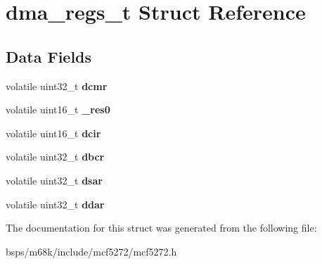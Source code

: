 \hypertarget{structdma__regs__t}{}\section{dma\+\_\+regs\+\_\+t Struct Reference}
\label{structdma__regs__t}
\subsection*{Data Fields}
\begin{DoxyCompactItemize}
\item 
\mbox{\label{structdma__regs__t_ac13b341ab8a7f3d5c92d0bb305bce47d}} 
volatile uint32\+\_\+t {\bfseries dcmr}
\item 
\mbox{\label{structdma__regs__t_af01259b03b50878fa6541ab8a9e7ebee}} 
volatile uint16\+\_\+t {\bfseries \+\_\+res0}
\item 
\mbox{\label{structdma__regs__t_a59b4cdfb2714e097e8d5e601e752529e}} 
volatile uint16\+\_\+t {\bfseries dcir}
\item 
\mbox{\label{structdma__regs__t_a1f27824ecded695c7a1b600ae29e17e0}} 
volatile uint32\+\_\+t {\bfseries dbcr}
\item 
\mbox{\label{structdma__regs__t_a372faeed963942fb8174a1efc563e637}} 
volatile uint32\+\_\+t {\bfseries dsar}
\item 
\mbox{\label{structdma__regs__t_ae5a9978e47eb9e568893b33b296c8da6}} 
volatile uint32\+\_\+t {\bfseries ddar}
\end{DoxyCompactItemize}


The documentation for this struct was generated from the following file\+:\begin{DoxyCompactItemize}
\item 
bsps/m68k/include/mcf5272/mcf5272.\+h\end{DoxyCompactItemize}
